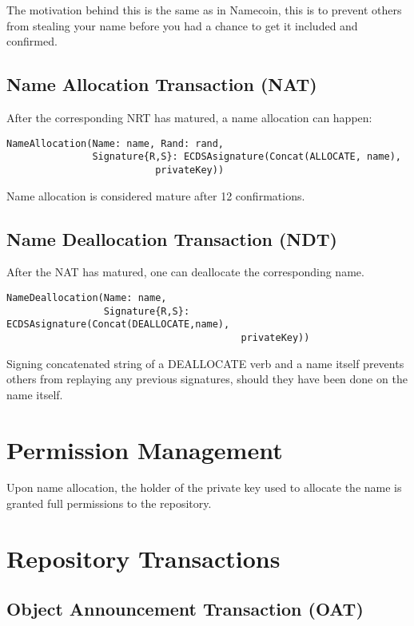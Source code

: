 \documentclass[a4paper]{article}
\begin{document}
The motivation behind this is the same as in Namecoin, this is to prevent others from stealing your name before you had a chance to get it included and confirmed.

\subsection{Name Allocation Transaction (NAT)}

After the corresponding NRT has matured, a name allocation can happen:

\begin{verbatim}
NameAllocation(Name: name, Rand: rand,
               Signature{R,S}: ECDSAsignature(Concat(ALLOCATE, name),
                          privateKey))
\end{verbatim}

Name allocation is considered mature after 12 confirmations.

\subsection{Name Deallocation Transaction (NDT)}

After the NAT has matured, one can deallocate the corresponding name.

\begin{verbatim}
NameDeallocation(Name: name,
                 Signature{R,S}: ECDSAsignature(Concat(DEALLOCATE,name),
                                         privateKey))
\end{verbatim}

Signing concatenated string of a DEALLOCATE verb and a name itself prevents others from replaying any previous signatures, should they have been done on the name itself.

\section{Permission Management}

Upon name allocation, the holder of the private key used to allocate the name is granted full permissions to the repository.

\section{Repository Transactions}

\subsection{Object Announcement Transaction (OAT)}
\end{document}
